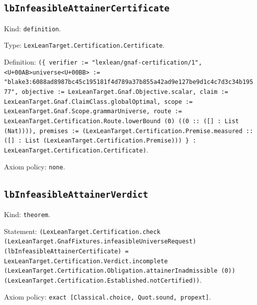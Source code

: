 \documentclass[11pt]{article}
\begin{document}
\subsection*{\texttt{lbInfeasibleAttainerCertificate}}
\noindent Kind: \texttt{definition}.\par
\noindent Type: \texttt{LexLeanTarget.Certification.Certificate}.\par
\noindent Definition: \texttt{(\{ verifier := "lexlean/gnaf-certification/1", <U+00AB>universe<U+00BB> := "blake3:6088ad8987bc45c195181f4d789a37b855a42ad9e127be9d1c4c7d3c34b19577", objective := LexLeanTarget.Gnaf.Objective.scalar, claim := LexLeanTarget.Gnaf.ClaimClass.globalOptimal, scope := LexLeanTarget.Gnaf.Scope.grammarUniverse, route := LexLeanTarget.Certification.Route.lowerBound (0) ((0 :: ([] : List (Nat)))), premises := (LexLeanTarget.Certification.Premise.measured :: ([] : List (LexLeanTarget.Certification.Premise))) \} : LexLeanTarget.Certification.Certificate)}.\par
\noindent Axiom policy: \texttt{none}.\par
\subsection*{\texttt{lbInfeasibleAttainerVerdict}}
\noindent Kind: \texttt{theorem}.\par
\noindent Statement: \texttt{(LexLeanTarget.Certification.check (LexLeanTarget.GnafFixtures.infeasibleUniverseRequest) (lbInfeasibleAttainerCertificate) = LexLeanTarget.Certification.Verdict.incomplete (LexLeanTarget.Certification.Obligation.attainerInadmissible (0)) (LexLeanTarget.Certification.Established.notCertified))}.\par
\noindent Axiom policy: \texttt{exact [Classical.choice, Quot.sound, propext]}.\par
\end{document}
